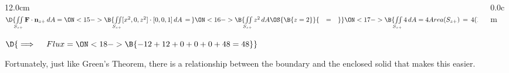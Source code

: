\begin{frame}
\begin{columns}
\begin{column}{12.0cm}
$\D{\iint \limits_{S_{z+}} {\bf F} \cdot {\bf n}_{z+}\, dA = 
\ON<15->{\B{\iint \limits_{S_{z+}} [x^2,0,z^2] \cdot [0,0,1]\, dA \,=\, }}
\ON<16->{\B{\iint \limits_{S_{z+}} z^2 \, dA \OS{\B{z=2}}{\quad=\quad} }}
\ON<17->{\B{\iint \limits_{S_{z+}} 4 \, dA = 4Area(S_{z+}) \,=\, 4(12) = 48}}}$
	
\vspace{0.3cm}

\begin{center}
	$\D{\implies \quad Flux = \ON<18->{\B{-12+12+0+0+0+48 = 48}}}$
\end{center}

Fortunately, just like Green's Theorem, there is a relationship between the boundary and the enclosed solid that makes this easier.
	
\end{column}\begin{column}{0.0cm}\end{column}\end{columns}
\end{frame}


%
%
%	
%	
%
%
%

